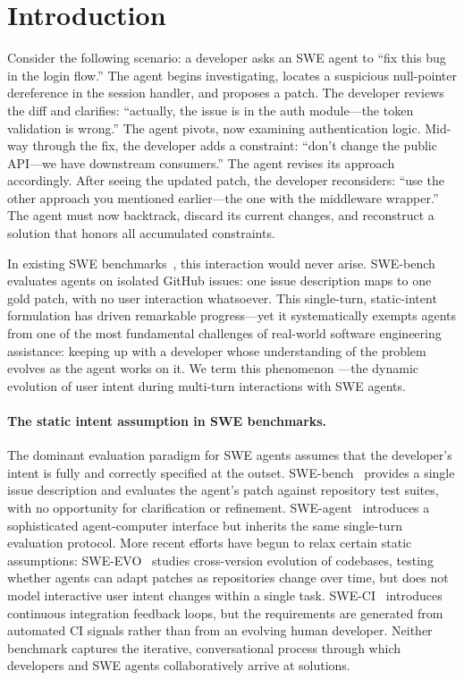 \section{Introduction}
\label{sec:introduction}

Consider the following scenario: a developer asks an SWE agent to ``fix this bug in the login flow.'' The agent begins investigating, locates a suspicious null-pointer dereference in the session handler, and proposes a patch. The developer reviews the diff and clarifies: ``actually, the issue is in the auth module---the token validation is wrong.'' The agent pivots, now examining authentication logic. Mid-way through the fix, the developer adds a constraint: ``don't change the public API---we have downstream consumers.'' The agent revises its approach accordingly. After seeing the updated patch, the developer reconsiders: ``use the other approach you mentioned earlier---the one with the middleware wrapper.'' The agent must now backtrack, discard its current changes, and reconstruct a solution that honors all accumulated constraints.

In existing SWE benchmarks~\citep{jimenez2024swebench, yang2024sweagent}, this interaction would never arise. SWE-bench evaluates agents on isolated GitHub issues: one issue description maps to one gold patch, with no user interaction whatsoever. This single-turn, static-intent formulation has driven remarkable progress---yet it systematically exempts agents from one of the most fundamental challenges of real-world software engineering assistance: keeping up with a developer whose understanding of the problem evolves as the agent works on it. We term this phenomenon \textbf{\drift{}}---the dynamic evolution of user intent during multi-turn interactions with SWE agents.

\paragraph{The static intent assumption in SWE benchmarks.}
The dominant evaluation paradigm for SWE agents assumes that the developer's intent is fully and correctly specified at the outset. SWE-bench~\citep{jimenez2024swebench} provides a single issue description and evaluates the agent's patch against repository test suites, with no opportunity for clarification or refinement. SWE-agent~\citep{yang2024sweagent} introduces a sophisticated agent-computer interface but inherits the same single-turn evaluation protocol. More recent efforts have begun to relax certain static assumptions: SWE-EVO~\citep{sweevo2025} studies cross-version evolution of codebases, testing whether agents can adapt patches as repositories change over time, but does not model interactive user intent changes within a single task. SWE-CI~\citep{sweci2026} introduces continuous integration feedback loops, but the requirements are generated from automated CI signals rather than from an evolving human developer. Neither benchmark captures the iterative, conversational process through which developers and SWE agents collaboratively arrive at solutions.

